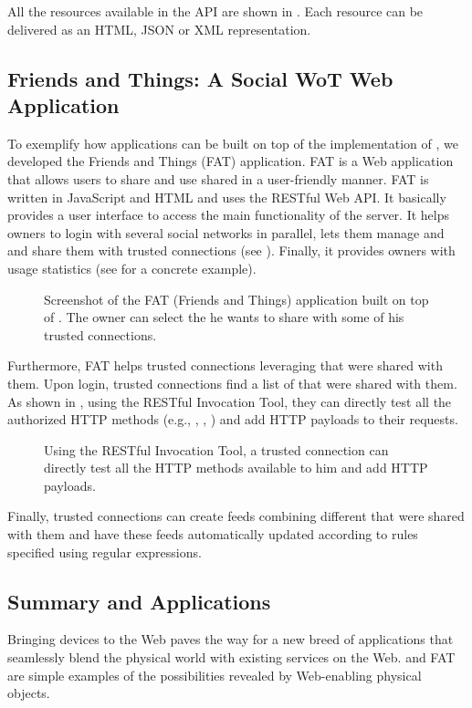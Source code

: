 All the resources available in the API are shown in . Each resource can be delivered as an HTML, JSON or XML representation.

\subsection{Friends and Things: A Social WoT Web Application}
To exemplify how applications can be built on top of the implementation of \sac{}, we developed the Friends and Things (FAT) application. FAT is a Web application that allows users to share and use shared \sts{} in a user-friendly manner. FAT is written in JavaScript and HTML and uses the \sac{} RESTful Web API. It basically provides a user interface to access the main functionality of the \sac{} server. It helps owners to login with several social networks in parallel, lets them manage \sts{} and \sgs{} and share them with trusted connections (see ). Finally, it provides owners with usage statistics (see  for a concrete example).
\begin{figure}
\caption{Screenshot of the FAT (Friends and Things) application built on top of \sac{}. The owner can select the \sts{} he wants to share with some of his trusted connections.}
\label{fig:FAT-share}
\end{figure}

Furthermore, FAT helps trusted connections leveraging \sts{} that were shared with them. Upon login, trusted connections find a list of \sts{} that were shared with them. As shown in , using the RESTful Invocation Tool, they can directly test all the authorized HTTP methods (e.g., , , ) and add HTTP payloads to their requests.
\begin{figure}
\caption{Using the RESTful Invocation Tool, a trusted connection can directly test all the HTTP methods available to him and add HTTP payloads.}
\label{fig:FAT-invoke}
\end{figure}
Finally, trusted connections can create feeds combining different \sts{} that were shared with them and have these feeds automatically updated according to rules specified using regular expressions.


\subsection{Summary and Applications}
Bringing devices to the Web paves the way for a new breed of applications that seamlessly blend the physical world with existing services on the Web. \sac{} and FAT are simple examples of the possibilities revealed by Web-enabling physical objects.


